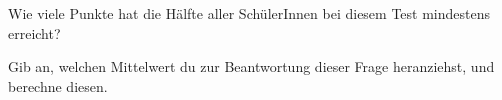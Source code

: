 \begin{beispiel}[WS 1.3]{1}
Wie viele Punkte hat die Hälfte aller SchülerInnen bei diesem Test mindestens erreicht?

Gib an, welchen Mittelwert du zur Beantwortung dieser Frage heranziehst, und berechne diesen.

\end{beispiel}